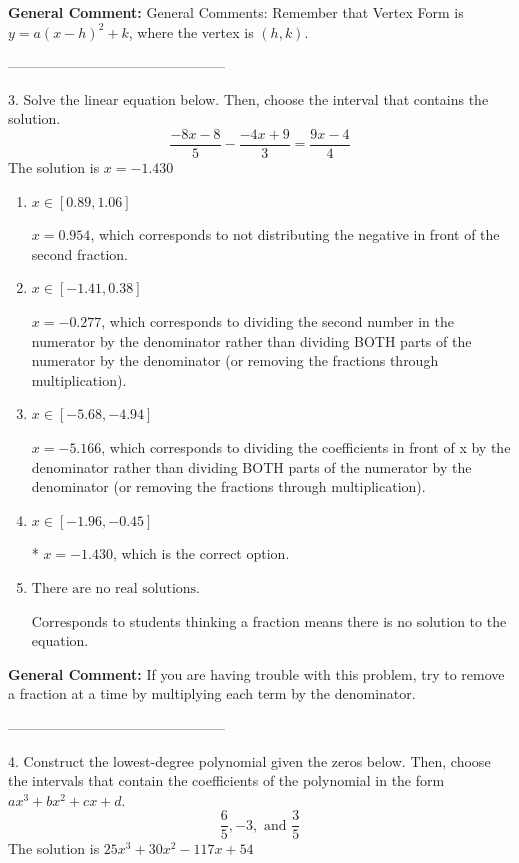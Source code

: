 \documentclass{extbook}[14pt]
\begin{document}
\textbf{General Comment:} General Comments: Remember that Vertex Form is $y = a(x-h)^2+k$, where the vertex is $(h, k)$. 

-----------------------------------------------

3. Solve the linear equation below. Then, choose the interval that contains the solution.
\[ \frac{-8x -8}{5} - \frac{-4x + 9}{3} = \frac{9x -4}{4} \] 
The solution is $ x = -1.430 $ 

\begin{enumerate}[label=\Alph*.] 
\item $ x \in [0.89, 1.06] $ 

  $x = 0.954$, which corresponds to not distributing the negative in front of the second fraction. 
\item $ x \in [-1.41, 0.38] $ 

  $x = -0.277$, which corresponds to dividing the second number in the numerator by the denominator rather than dividing BOTH parts of the numerator by the denominator (or removing the fractions through multiplication). 
\item $ x \in [-5.68, -4.94] $ 

  $x = -5.166$, which corresponds to dividing the coefficients in front of x by the denominator rather than dividing BOTH parts of the numerator by the denominator (or removing the fractions through multiplication). 
\item $ x \in [-1.96, -0.45] $ 

 * $x = -1.430$, which is the correct option. 
\item $ \text{There are no real solutions.} $ 

 Corresponds to students thinking a fraction means there is no solution to the equation. 
\end{enumerate} 
 
\textbf{General Comment:} If you are having trouble with this problem, try to remove a fraction at a time by multiplying each term by the denominator. 

-----------------------------------------------

4. Construct the lowest-degree polynomial given the zeros below. Then, choose the intervals that contain the coefficients of the polynomial in the form $ax^3+bx^2+cx+d$.
\[ \frac{6}{5}, -3, \text{ and } \frac{3}{5} \] 
The solution is $ 25x^{3} +30 x^{2} -117 x + 54 $ 
\end{document}
